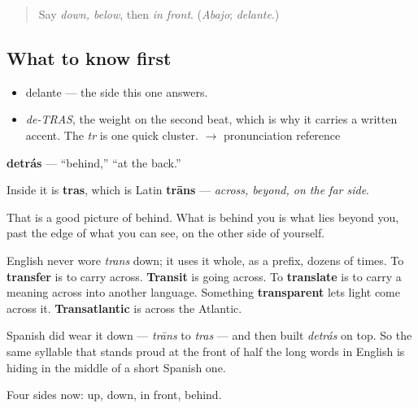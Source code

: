 \label{lesson:ES-C341-detras}



\begin{quote}
Say \emph{down, below}, then \emph{in front}. (\emph{Abajo}; \emph{delante}.)
\end{quote}

\subsection*{What to know first}
\begin{itemize}
\raggedright
  \item delante — the side this one answers.
\end{itemize}

\begin{sounds}
\begin{itemize}
\raggedright
  \item \emph{de-TRAS}, the weight on the second beat, which is why it carries a written accent. The \emph{tr} is one quick cluster. $\to$ pronunciation reference
\end{itemize}
\end{sounds}

\begin{cousinweb}
\textbf{detrás} — \textquotedblleft{}behind,\textquotedblright{} \textquotedblleft{}at the back.\textquotedblright{}

Inside it is \textbf{tras}, which is Latin \textbf{trāns} — \emph{across, beyond, on the far side}.

That is a good picture of behind. What is behind you is what lies beyond you, past the edge of what you can see, on the other side of yourself.

English never wore \emph{trans} down; it uses it whole, as a prefix, dozens of times. To \textbf{transfer} is to carry across. \textbf{Transit} is going across. To \textbf{translate} is to carry a meaning across into another language. Something \textbf{transparent} lets light come across it. \textbf{Transatlantic} is across the Atlantic.

Spanish did wear it down — \emph{trāns} to \emph{tras} — and then built \emph{detrás} on top. So the same syllable that stands proud at the front of half the long words in English is hiding in the middle of a short Spanish one.
\end{cousinweb}

\begin{grammarlens}[title={What you've built}]
Four sides now: up, down, in front, behind.
\end{grammarlens}

